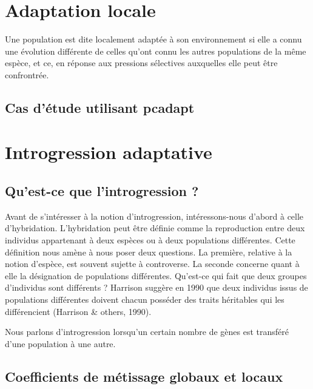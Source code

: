 \documentclass[12pt,twoside]{reedthesis}
\theoremstyle{definition}
\theoremstyle{definition}
\theoremstyle{remark}
\begin{document}
  \chapter{Adaptation locale}\label{adaptation-locale}
  
  Une population est dite localement adaptée à son environnement si elle a
  connu une évolution différente de celles qu'ont connu les autres
  populations de la même espèce, et ce, en réponse aux pressions
  sélectives auxquelles elle peut être confrontrée.
  
  \section{Cas d'étude utilisant
  pcadapt}\label{cas-detude-utilisant-pcadapt}
  
  \chapter{Introgression adaptative}\label{introgression-adaptative}
  
  \section{Qu'est-ce que l'introgression
  ?}\label{quest-ce-que-lintrogression}
  
  Avant de s'intéresser à la notion d'introgression, intéressons-nous
  d'abord à celle d'hybridation. L'hybridation peut être définie comme la
  reproduction entre deux individus appartenant à deux espèces ou à deux
  populations différentes. Cette définition nous amène à nous poser deux
  questions. La première, relative à la notion d'espèce, est souvent
  sujette à controverse. La seconde concerne quant à elle la désignation
  de populations différentes. Qu'est-ce qui fait que deux groupes
  d'individus sont différents ? Harrison suggère en 1990 que deux
  individus issus de populations différentes doivent chacun posséder des
  traits héritables qui les différencient (Harrison \& others, 1990).
  
  Nous parlons d'introgression lorsqu'un certain nombre de gènes est
  transféré d'une population à une autre.
  
  \section{Coefficients de métissage globaux et
  locaux}\label{coefficients-de-metissage-globaux-et-locaux}
  
\end{document}
